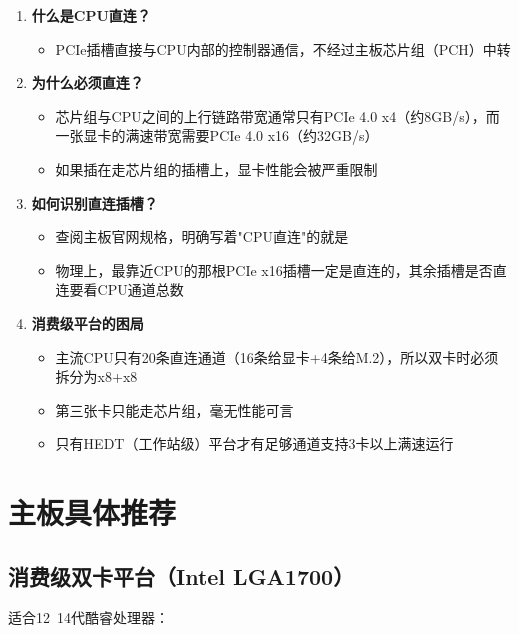 \documentclass[12pt,UTF8]{ctexbook}
\begin{document}
\begin{enumerate}
    \item \textbf{什么是CPU直连？}
    \begin{itemize}[leftmargin=2em]
        \item PCIe插槽直接与CPU内部的控制器通信，不经过主板芯片组（PCH）中转
    \end{itemize}
    
    \item \textbf{为什么必须直连？}
    \begin{itemize}[leftmargin=2em]
        \item 芯片组与CPU之间的上行链路带宽通常只有PCIe 4.0 x4（约8GB/s），而一张显卡的满速带宽需要PCIe 4.0 x16（约32GB/s）
        \item 如果插在走芯片组的插槽上，显卡性能会被严重限制
    \end{itemize}
    
    \item \textbf{如何识别直连插槽？}
    \begin{itemize}[leftmargin=2em]
        \item 查阅主板官网规格，明确写着"CPU直连"的就是
        \item 物理上，最靠近CPU的那根PCIe x16插槽一定是直连的，其余插槽是否直连要看CPU通道总数
    \end{itemize}
    
    \item \textbf{消费级平台的困局}
    \begin{itemize}[leftmargin=2em]
        \item 主流CPU只有20条直连通道（16条给显卡+4条给M.2），所以双卡时必须拆分为x8+x8
        \item 第三张卡只能走芯片组，毫无性能可言
        \item 只有HEDT（工作站级）平台才有足够通道支持3卡以上满速运行
    \end{itemize}
\end{enumerate}

\section{主板具体推荐}

\subsection{消费级双卡平台（Intel LGA1700）}

适合12~14代酷睿处理器：
\end{document}
